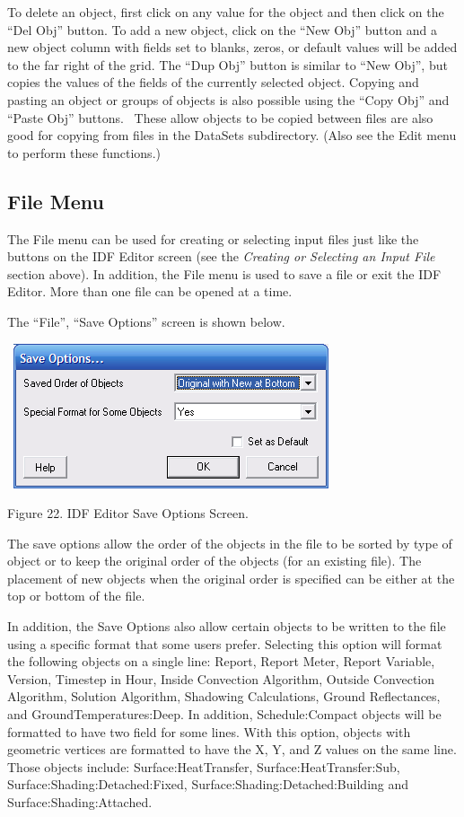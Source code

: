 To delete an object, first click on any value for the object and then click on the ``Del Obj'' button. To add a new object, click on the ``New Obj'' button and a new object column with fields set to blanks, zeros, or default values will be added to the far right of the grid. The ``Dup Obj'' button is similar to ``New Obj'', but copies the values of the fields of the currently selected object. Copying and pasting an object or groups of objects is also possible using the ``Copy Obj'' and ``Paste Obj'' buttons.~ These allow objects to be copied between files are also good for copying from files in the DataSets subdirectory. (Also see the Edit menu to perform these functions.)

\subsection{File Menu}\label{file-menu-000}

The File menu can be used for creating or selecting input files just like the buttons on the IDF Editor screen (see the \emph{Creating or Selecting an Input File} section above). In addition, the File menu is used to save a file or exit the IDF Editor. More than one file can be opened at a time.

The ``File'', ``Save Options'' screen is shown below.

~\includegraphics{media/image022.png}

Figure 22. IDF Editor Save Options Screen.

The save options allow the order of the objects in the file to be sorted by type of object or to keep the original order of the objects (for an existing file). The placement of new objects when the original order is specified can be either at the top or bottom of the file.

In addition, the Save Options also allow certain objects to be written to the file using a specific format that some users prefer. Selecting this option will format the following objects on a single line: Report, Report Meter, Report Variable, Version, Timestep in Hour, Inside Convection Algorithm, Outside Convection Algorithm, Solution Algorithm, Shadowing Calculations, Ground Reflectances, and GroundTemperatures:Deep. In addition, Schedule:Compact objects will be formatted to have two field for some lines. With this option, objects with geometric vertices are formatted to have the X, Y, and Z values on the same line. Those objects include: Surface:HeatTransfer, Surface:HeatTransfer:Sub, Surface:Shading:Detached:Fixed, Surface:Shading:Detached:Building and Surface:Shading:Attached.


